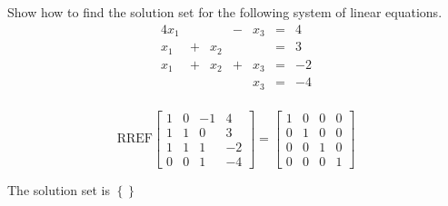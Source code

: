 
\begin{exerciseStatement}


Show how to find the solution set for the following system of linear equations. 
\begin{alignat*}{4} x_{1} & &  &-& x_{3} &=& 4 \\x_{1} &+& x_{2} & &  &=& 3 \\x_{1} &+& x_{2} &+& x_{3} &=& -2 \\ & &  & & x_{3} &=& -4 \\ \end{alignat*}
            


\end{exerciseStatement}
    
\begin{exerciseAnswer} 
\[\mathrm{RREF} \left[\begin{array}{ccc|c}
1 & 0 & -1 & 4 \\
1 & 1 & 0 & 3 \\
1 & 1 & 1 & -2 \\
0 & 0 & 1 & -4
\end{array}\right]  =  \left[\begin{array}{ccc|c}
1 & 0 & 0 & 0 \\
0 & 1 & 0 & 0 \\
0 & 0 & 1 & 0 \\
0 & 0 & 0 & 1
\end{array}\right] \]

The solution set is \( \left\{\right\} \)


\end{exerciseAnswer}
    
